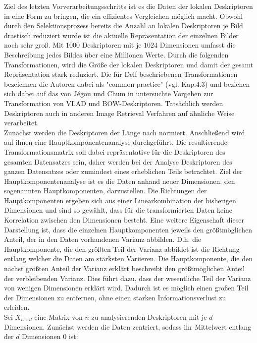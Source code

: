Ziel des letzten Vorverarbeitungsschritts ist es die Daten der lokalen Deskriptoren in eine Form zu bringen, die ein effizientes Vergleichen möglich macht. Obwohl durch den Selektionsprozess bereits die Anzahl an lokalen Deskriptoren je Bild drastisch reduziert wurde ist die aktuelle Repräsentation der einzelnen Bilder noch sehr groß. Mit $1000$ Deskriptoren mit je $1024$ Dimensionen umfasst die Beschreibung jedes Bildes über eine Millionen Werte. Durch die folgenden Transformationen, wird die Größe der lokalen Deskriptoren und damit der gesamt Repräsentation stark reduziert. Die für Delf beschriebenen Transformationen bezeichnen die Autoren dabei als "common practice" (vgl. \cite{delf} Kap.4.3) und beziehen sich dabei auf das von Jégou und Chum in \cite{common_practice} untersuchte Vorgehen zur Transformation von VLAD und BOW-Deskriptoren. Tatsächlich werden Deskriptoren auch in anderen Image Retrieval Verfahren \cite{convnet} \cite{one} auf ähnliche Weise verarbeitet.
\\
Zunächst werden die Deskriptoren der Länge nach normiert. Anschließend wird auf ihnen eine Hauptkomponentenanalyse durchgeführt. Die resultierende Transformationsmatrix soll dabei repräsentative für die Deskriptoren des gesamten Datensatzes sein, daher werden bei der Analyse Deskriptoren des ganzen Datensatzes oder zumindest eines erheblichen Teils betrachtet. Ziel der Hauptkomponentenanalyse ist es die Daten anhand neuer Dimensionen, den sogenannten Hauptkomponenten, darzustellen. Die Richtungen der Hauptkomponenten ergeben sich aus einer Linearkombination der bisherigen Dimensionen und sind so gewählt, dass für die transformierten Daten keine Korrelation zwischen den Dimensionen besteht. Eine weitere Eigenschaft dieser Darstellung ist, dass die einzelnen Hauptkomponenten jeweils den größtmöglichen Anteil, der in den Daten vorhandenen Varianz abbilden. D.h. die Hauptkomponente, die den größten Teil der Varianz abbildet ist die Richtung entlang welcher die Daten am stärksten Variieren. Die Hauptkomponente, die den nächst größten Anteil der Varianz erklärt beschreibt den größtmöglichen Anteil der verbleibenden Varianz. Dies führt dazu, dass der wesentliche Teil der Varianz von wenigen Dimensionen erklärt wird. Dadurch ist es möglich einen großen Teil der Dimensionen zu entfernen, ohne einen starken Informationsverlust zu erleiden.
\\
Sei $X_{n\times d}$ eine Matrix von $n$ zu analysierenden Deskriptoren mit je $d$ Dimensionen. 
Zunächst werden die Daten zentriert, sodass ihr Mittelwert entlang der $d$ Dimensionen $0$ ist:
